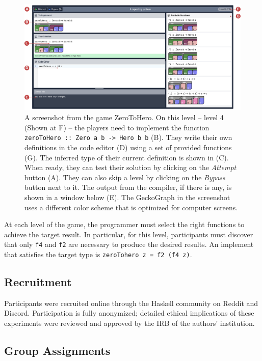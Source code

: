 \begin{figure}[hbt]
  \includegraphics[width=\linewidth]{figures/GamePlay}
  \caption[A screenshot from  the game ZeroToHero]{\label{fig:level-example} A screenshot from  the game ZeroToHero. On this level -- level 4 (Shown at F) -- the players need to implement the function \texttt{ zeroToHero :: Zero a b -> Hero b b} (B). They write their own definitions in the code editor (D) using a set of provided functions (G). The inferred type of their current definition is shown in (C). When ready, they can test their solution by clicking on the \textit{Attempt} button (A). They can also skip a level by clicking on the \textit{Bypass} button next to it. The output from the compiler, if there is any, is shown in a window below (E). The GeckoGraph in the screenshot uses a different color scheme that is optimized for computer screens.}
\end{figure}

At each level of the game, the programmer must select the right functions to achieve the target result. In particular, for this level, participants must discover that only \texttt{f4} and \texttt{f2} are necessary to produce the desired results. An implement that satisfies the target type is \texttt{zeroTohero z = f2  (f4  z)}. 


\subsection{Recruitment}
Participants were recruited online through the Haskell community on Reddit and Discord. Participation is fully anonymized; detailed ethical implications of these experiments were reviewed and approved by the IRB of the authors' institution.

\subsection{Group Assignments}

